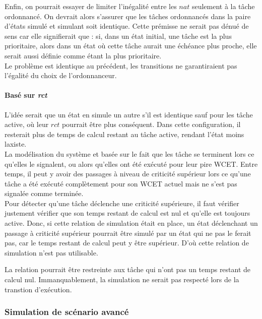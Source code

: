 \documentclass[11pt,a4paper,oneside]{book}
\theoremstyle{break}
\theoremstyle{breakplain}
\begin{document}
Enfin, on pourrait essayer de limiter l'inégalité entre les $nat$ seulement à la tâche ordonnancé. On devrait alors s'assurer que les tâches ordonnancés dans la paire d'états simulé et simulant soit identique. Cette prémisse ne serait pas dénué de sens car elle signifierait que : si, dans un état initial, une tâche est la plus prioritaire, alors dans un état où cette tâche aurait une échéance plus proche, elle serait aussi définie comme étant la plus prioritaire.\\
Le problème est identique au précédent, les transitions ne garantiraient pas l'égalité du choix de l'ordonnanceur.\\

\paragraph{Basé sur \textit{rct}}

L'idée serait que un état en simule un autre s'il est identique sauf pour les tâche active, où leur $rct$ pourrait être plus conséquent. Dans cette configuration, il resterait plus de temps de calcul restant au tâche active, rendant l'état moins laxiste.\\

La modélisation du système et basée sur le fait que les tâche se terminent lors ce qu'elles le signalent, ou alors qu'elles ont été exécuté pour leur pire WCET. Entre temps, il peut y avoir des passages à niveau de criticité supérieur lors ce qu'une tâche a été exécuté complètement pour son WCET actuel mais ne s'est pas signalée comme terminée.\\
Pour détecter qu'une tâche déclenche une criticité supérieure, il faut vérifier justement vérifier que son temps restant de calcul est nul et qu'elle est toujours active. Donc, si cette relation de simulation était en place, un état déclenchant un passage à criticité supérieur pourrait être simulé par un état qui ne pas le ferait pas, car le temps restant de calcul peut y être supérieur. D'où cette relation de simulation n'est pas utilisable.

La relation pourrait être restreinte aux tâche qui n'ont pas un temps restant de calcul nul. Immanquablement, la simulation ne serait pas respecté lors de la transtion d'exécution. 


\subsubsection{Simulation de scénario avancé}
\end{document}
